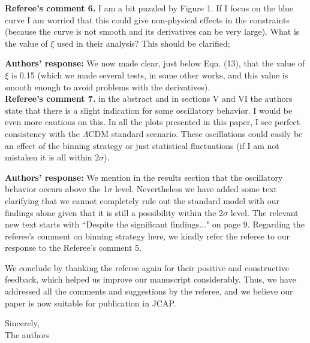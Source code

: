 \documentclass[10pt,fleqn]{report}
\begin{document}
\noindent\textbf{Referee's comment 6.} I am a bit puzzled by Figure 1. If I focus on the blue curve I am worried
that this could give non-physical effects in the constraints (because the
curve is not smooth and its derivatives can be very large). What is the
value of $\xi$ used in their analysis? This should be clarified;

\noindent\textbf{Authors'  response:}  We now made clear, just below Eqn. (13), that the value of $\xi$ is 0.15 (which we made several tests, in some other works, and this value is smooth enough to avoid problems with the derivatives).
\\

\noindent\textbf{Referee's comment 7.} in the abstract and in sections V and VI the authors state that there is
a slight indication for some oscillatory behavior. I would be even more
cautious on this. In all the plots presented in this paper, I see perfect
consistency with the $\Lambda$CDM standard scenario. These oscillations could
easily be an effect of the binning strategy or just statistical fluctuations
(if I am not mistaken it is all within 2$\sigma$).

\noindent\textbf{Authors'  response:}  We mention in the results section that the oscillatory behavior occurs above the 1$\sigma$ level. Nevertheless we have added some text clarifying that we cannot completely rule out the standard model with our findings alone given that it is still a possibility within the 2$\sigma$ level. The relevant new text starts with ``Despite the significant findings..." on page 9. Regarding the referee's comment on binning strategy here, we kindly refer the referee to our response to the Referee's comment 5.
\\





\bigskip

We conclude by thanking the referee again for their positive and constructive feedback, which helped us improve our manuscript considerably. Thus, we have addressed all the comments and suggestions by the referee, and we believe our paper is now suitable for publication in JCAP.\\

\bigskip

Sincerely,\\

The authors

\end{document}
